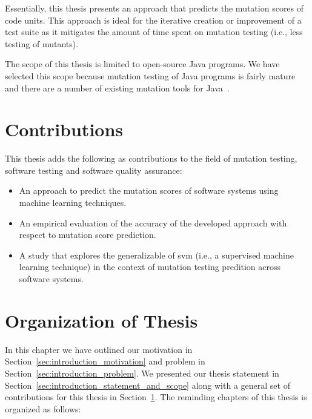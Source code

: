 Essentially, this thesis presents an approach that predicts the mutation scores of code units. This approach is ideal for the iterative creation or improvement of a test suite as it mitigates the amount of time spent on mutation testing (i.e., less testing of mutants).

The scope of this thesis is limited to open-source Java programs. We have selected this scope because mutation testing of Java programs is fairly mature and there are a number of existing mutation tools for Java~\cite{JH10}.


\section{Contributions}
\label{sec:introduction_contributions}
This thesis adds the following as contributions to the field of mutation testing, software testing and software quality assurance:

\begin{itemize}
  \item An approach to predict the mutation scores of software systems using machine learning techniques.
  \item An empirical evaluation of the accuracy of the developed approach with respect to mutation score prediction.
  \item A study that explores the generalizable of \gls{svm} (i.e., a supervised machine learning technique) in the context of mutation testing predition across software systems.
\end{itemize}


\section{Organization of Thesis}
\label{sec:introduction_organization}
In this chapter we have outlined our motivation in Section~\ref{sec:introduction_motivation} and problem in Section~\ref{sec:introduction_problem}. We presented our thesis statement in Section~\ref{sec:introduction_statement_and_scope} along with a general set of contributions for this thesis in Section~\ref{sec:introduction_contributions}. The reminding chapters of this thesis is organized as follows:

